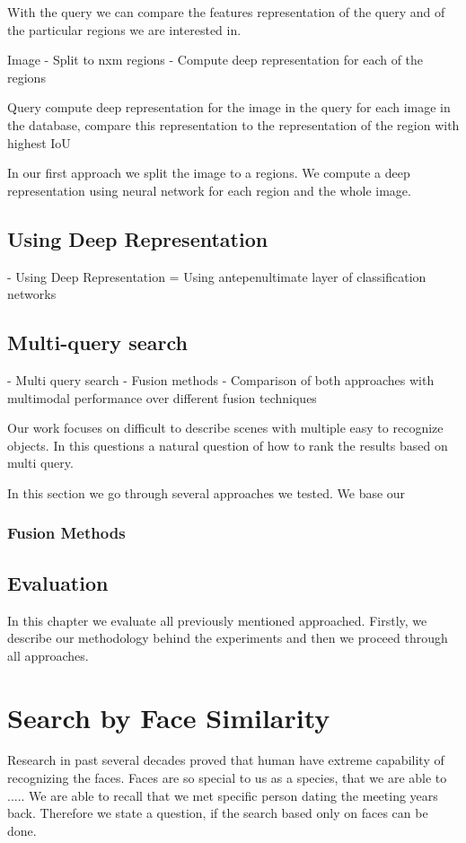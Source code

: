 With the query we can compare the features representation of the query and of the particular regions we are interested in.

Image
- Split to nxm regions
- Compute deep representation for each of the regions

Query
compute deep representation for the image in the query
for each image in the database, compare this representation to the representation of the region with highest IoU


In our first approach we split the image to a regions. We compute a deep representation using neural network for each region and the whole image. 
\section{ Using Deep Representation}
   - Using Deep Representation
      = Using antepenultimate layer of classification networks

\section{Multi-query search}
- Multi query search
  - Fusion methods
  - Comparison of both approaches with multimodal performance over different fusion techniques

Our work focuses on difficult to describe scenes with multiple easy to recognize objects. In this questions a natural question of how to rank the results based on multi query.

In this section we go through several approaches we tested. We base our 

\subsection{Fusion Methods}

\section{Evaluation}
In this chapter we evaluate all previously mentioned approached. Firstly, we describe our methodology behind the experiments and then we proceed through all approaches. 

\chapter{Search by Face Similarity}

Research in past several decades proved that human have extreme capability of recognizing the faces. Faces are so special to us as a species, that we are able to ..... We are able to recall that we met specific person dating the meeting years back. Therefore we state a question, if the search based only on faces can be done.

